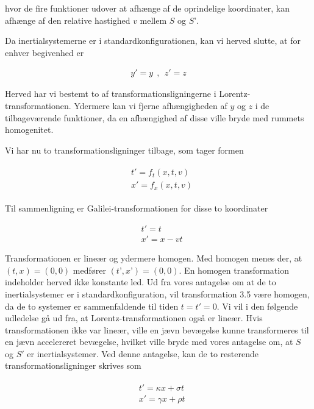 hvor de fire funktioner udover at afhænge af de oprindelige koordinater, kan afhænge af den relative hastighed $v$ mellem $S$ og $S’$.

Da inertialsystemerne er i standardkonfigurationen, kan vi herved slutte, at for enhver begivenhed er

\begin{align}
	y'=y \ \ , \ \ z'=z \nonumber
\end{align}

Herved har vi bestemt to af transformationsligningerne i Lorentz-transformationen. Ydermere kan vi fjerne afhængigheden af $y$ og $z$ i de tilbageværende funktioner, da en afhængighed af disse ville bryde med rummets homogenitet.

Vi har nu to transformationsligninger tilbage, som tager formen

\begin{align}
	\begin{split}
	&t'=f_t(x, t, v) \\
	&x'=f_x(x, t, v) 
	\end{split}
\end{align}

Til sammenligning er Galilei-transformationen for disse to koordinater

\begin{align*}
	&t'=t \\
	&x'=x-vt
\end{align*}

Transformationen er lineær og ydermere homogen. Med homogen menes der, at $(t,x)=(0,0)$ medfører $(t’,x’)=(0,0)$. En homogen transformation indeholder herved ikke konstante led. Ud fra vores antagelse om at de to inertialsystemer er i standardkonfiguration, vil transformation 3.5 være homogen, da de to systemer er sammenfaldende til tiden $t=t'=0$. Vi vil i den følgende udledelse gå ud fra, at Lorentz-transformationen også er lineær. Hvis transformationen ikke var lineær, ville en jævn bevægelse kunne transformeres til en jævn accelereret bevægelse, hvilket ville bryde med vores antagelse om, at $S$ og $S'$ er inertialsystemer. Ved denne antagelse, kan de to resterende transformationsligninger skrives som

\begin{align}
	\begin{split}
	&t'=\kappa x+\sigma t \\
	&x'=\gamma x+\rho t
	\end{split}
	\label{sr.eq4}
\end{align}

